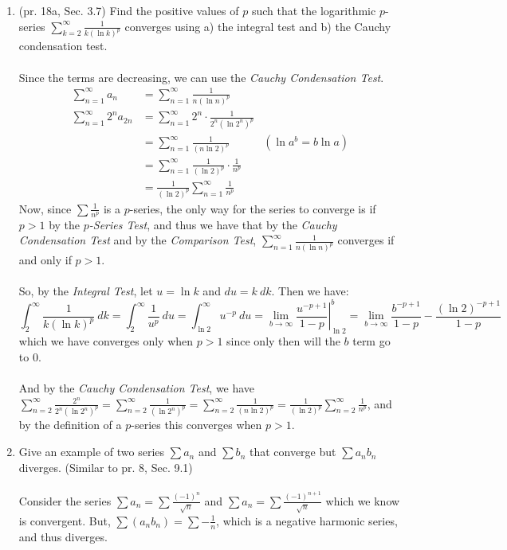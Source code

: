\documentclass[12pt,letterpaper]{article}
\newcommand{\limx}[2]{\displaystyle\lim\limits_{#1 \to #2}}
\theoremstyle{case}
\theoremstyle{definition}
\begin{document}
\begin{enumerate}
		\item (pr. 18a, Sec. 3.7) Find the positive values of $p$ such that the logarithmic $p$-series $\displaystyle\sum_{k=2}^{\infty} \frac{1}{k(\ln k)^p}$ converges using a) the integral test and b) the Cauchy condensation test.
		\\\\Since the terms are decreasing, we can use the \textit{Cauchy Condensation Test}.
		\begin{align*}
			\sum_{n=1}^{\infty} a_n &= \sum_{n=1}^{\infty}\frac{1}{n(\ln n)^p} \\
			\sum_{n=1}^{\infty} 2^na_{2n} &= \sum_{n=1}^{\infty} 2^n\cdot \frac{1}{2^n(\ln 2^n)^p} \\
			&= \sum_{n=1}^{\infty} \frac{1}{(n \ln 2)^p} &(\ln a^b = b \ln a) \\
			&= \sum_{n=1}^{\infty} \frac{1}{(\ln 2)^p} \cdot \frac{1}{n^p} \\
			&= \frac{1}{(\ln 2)^p} \sum_{n=1}^{\infty} \frac{1}{n^p}
		\end{align*}
		Now, since $\sum \frac{1}{n^p}$ is a $p$-series, the only way for the series to converge is if $p >1$ by the \textit{$p$-Series Test}, and thus we have that by the \textit{Cauchy Condensation Test} and by the \textit{Comparison Test}, $\displaystyle\sum_{n=1}^{\infty} \frac{1}{n (\ln n)^p}$ converges if and only if $p > 1$.
		\\\\So, by the \textit{Integral Test}, let $u=\ln k$ and $du = k\ dk$. Then we have:
		\[\int_{2}^{\infty} \frac{1}{k(\ln k)^p}\ dk = \int_{2}^{\infty} \frac{1}{u^p}\ du = \int_{\ln 2}^{\infty} u^{-p}\ du = \limx{b}{\infty} \left.\frac{u^{-p+1}}{1-p}\right|_{\ln 2}^b=\limx{b}{\infty} \frac{b^{-p+1}}{1-p}-\frac{(\ln 2)^{-p+1}}{1-p}\]
		which we have converges only when $p > 1$ since only then will the $b$ term go to 0.
		\\\\And by the \textit{Cauchy Condensation Test}, we have $\displaystyle\sum_{n=2}^{\infty} \frac{2^n}{2^n(\ln 2^n)^p}=\sum_{n=2}^{\infty} \frac{1}{(\ln 2^n)^p}=\sum_{n=2}^{\infty} \frac{1}{(n \ln 2)^p} = \frac{1}{(\ln 2)^p} \sum_{n=2}^{\infty} \frac{1}{n^p}$, and by the definition of a $p$-series this converges when $p>1$.
		
		\item Give an example of two series $\sum a_n$ and $\sum b_n$ that converge but $\sum a_nb_n$ diverges. (Similar to pr. 8, Sec. 9.1)
		\\\\Consider the series $\sum a_n=\sum \displaystyle\frac{(-1)^n}{\sqrt{n}}$ and $\sum a_n=\sum \displaystyle\frac{(-1)^{n+1}}{\sqrt{n}}$ which we know is convergent. But, $\sum (a_nb_n) = \sum -\frac{1}{n}$, which is a negative harmonic series, and thus diverges.\\
		

\end{enumerate}
\end{document}
